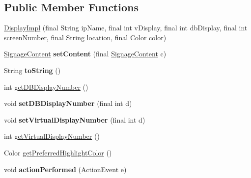 \subsection*{Public Member Functions}
\begin{DoxyCompactItemize}
\item 
\hyperlink{classgov_1_1fnal_1_1ppd_1_1dd_1_1display_1_1DisplayImpl_acb6974b45a772ac261c72c99d0df724b}{Display\-Impl} (final String ip\-Name, final int v\-Display, final int db\-Display, final int screen\-Number, final String location, final Color color)
\item 
\hypertarget{classgov_1_1fnal_1_1ppd_1_1dd_1_1display_1_1DisplayImpl_a39ab9312ab3a54c61403b95b30f7d831}{\hyperlink{interfacegov_1_1fnal_1_1ppd_1_1dd_1_1signage_1_1SignageContent}{Signage\-Content} {\bfseries set\-Content} (final \hyperlink{interfacegov_1_1fnal_1_1ppd_1_1dd_1_1signage_1_1SignageContent}{Signage\-Content} c)}\label{classgov_1_1fnal_1_1ppd_1_1dd_1_1display_1_1DisplayImpl_a39ab9312ab3a54c61403b95b30f7d831}

\item 
\hypertarget{classgov_1_1fnal_1_1ppd_1_1dd_1_1display_1_1DisplayImpl_aa322597e9f586d4a5c4dfb78e2b7e793}{String {\bfseries to\-String} ()}\label{classgov_1_1fnal_1_1ppd_1_1dd_1_1display_1_1DisplayImpl_aa322597e9f586d4a5c4dfb78e2b7e793}

\item 
int \hyperlink{classgov_1_1fnal_1_1ppd_1_1dd_1_1display_1_1DisplayImpl_a1b294a2d2cd0b9f51e2489b06542a522}{get\-D\-B\-Display\-Number} ()
\item 
\hypertarget{classgov_1_1fnal_1_1ppd_1_1dd_1_1display_1_1DisplayImpl_a254f9588dac8e1d1cff92e99e103adf2}{void {\bfseries set\-D\-B\-Display\-Number} (final int d)}\label{classgov_1_1fnal_1_1ppd_1_1dd_1_1display_1_1DisplayImpl_a254f9588dac8e1d1cff92e99e103adf2}

\item 
\hypertarget{classgov_1_1fnal_1_1ppd_1_1dd_1_1display_1_1DisplayImpl_a3066278882e766ccb363ae335d25dd18}{void {\bfseries set\-Virtual\-Display\-Number} (final int d)}\label{classgov_1_1fnal_1_1ppd_1_1dd_1_1display_1_1DisplayImpl_a3066278882e766ccb363ae335d25dd18}

\item 
int \hyperlink{classgov_1_1fnal_1_1ppd_1_1dd_1_1display_1_1DisplayImpl_af2f963a8459aee3de743051f96e20bc8}{get\-Virtual\-Display\-Number} ()
\item 
Color \hyperlink{classgov_1_1fnal_1_1ppd_1_1dd_1_1display_1_1DisplayImpl_a1a3e04f0de207a90b4ad2049ac192758}{get\-Preferred\-Highlight\-Color} ()
\item 
\hypertarget{classgov_1_1fnal_1_1ppd_1_1dd_1_1display_1_1DisplayImpl_a0250d4db31cb4ab616c923285c378251}{void {\bfseries action\-Performed} (Action\-Event e)}\label{classgov_1_1fnal_1_1ppd_1_1dd_1_1display_1_1DisplayImpl_a0250d4db31cb4ab616c923285c378251}


\end{DoxyCompactItemize}
